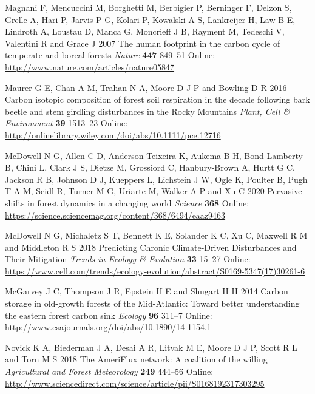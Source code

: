 \documentclass[
]{article}
\newlength{\cslhangindent}
\newenvironment{cslreferences}%
  {\setlength{\parindent}{0pt}%
  \everypar{\setlength{\hangindent}{\cslhangindent}}\ignorespaces}%
  {\par}
\begin{document}
\begin{cslreferences}
\leavevmode\hypertarget{ref-magnani_human_2007}{}%
Magnani F, Mencuccini M, Borghetti M, Berbigier P, Berninger F, Delzon
S, Grelle A, Hari P, Jarvis P G, Kolari P, Kowalski A S, Lankreijer H,
Law B E, Lindroth A, Loustau D, Manca G, Moncrieff J B, Rayment M,
Tedeschi V, Valentini R and Grace J 2007 The human footprint in the
carbon cycle of temperate and boreal forests \emph{Nature} \textbf{447}
849--51 Online: \url{http://www.nature.com/articles/nature05847}

\leavevmode\hypertarget{ref-maurer_carbon_2016}{}%
Maurer G E, Chan A M, Trahan N A, Moore D J P and Bowling D R 2016
Carbon isotopic composition of forest soil respiration in the decade
following bark beetle and stem girdling disturbances in the Rocky
Mountains \emph{Plant, Cell \& Environment} \textbf{39} 1513--23 Online:
\url{http://onlinelibrary.wiley.com/doi/abs/10.1111/pce.12716}

\leavevmode\hypertarget{ref-mcdowell_pervasive_2020}{}%
McDowell N G, Allen C D, Anderson-Teixeira K, Aukema B H, Bond-Lamberty
B, Chini L, Clark J S, Dietze M, Grossiord C, Hanbury-Brown A, Hurtt G
C, Jackson R B, Johnson D J, Kueppers L, Lichstein J W, Ogle K, Poulter
B, Pugh T A M, Seidl R, Turner M G, Uriarte M, Walker A P and Xu C 2020
Pervasive shifts in forest dynamics in a changing world \emph{Science}
\textbf{368} Online:
\url{https://science.sciencemag.org/content/368/6494/eaaz9463}

\leavevmode\hypertarget{ref-mcdowell_predicting_2018}{}%
McDowell N G, Michaletz S T, Bennett K E, Solander K C, Xu C, Maxwell R
M and Middleton R S 2018 Predicting Chronic Climate-Driven Disturbances
and Their Mitigation \emph{Trends in Ecology \& Evolution} \textbf{33}
15--27 Online:
\url{https://www.cell.com/trends/ecology-evolution/abstract/S0169-5347(17)30261-6}

\leavevmode\hypertarget{ref-mcgarvey_carbon_2014}{}%
McGarvey J C, Thompson J R, Epstein H E and Shugart H H 2014 Carbon
storage in old-growth forests of the Mid-Atlantic: Toward better
understanding the eastern forest carbon sink \emph{Ecology} \textbf{96}
311--7 Online:
\url{http://www.esajournals.org/doi/abs/10.1890/14-1154.1}

\leavevmode\hypertarget{ref-novick_ameriflux_2018}{}%
Novick K A, Biederman J A, Desai A R, Litvak M E, Moore D J P, Scott R L
and Torn M S 2018 The AmeriFlux network: A coalition of the willing
\emph{Agricultural and Forest Meteorology} \textbf{249} 444--56 Online:
\url{http://www.sciencedirect.com/science/article/pii/S0168192317303295}


\end{cslreferences}
\end{document}
